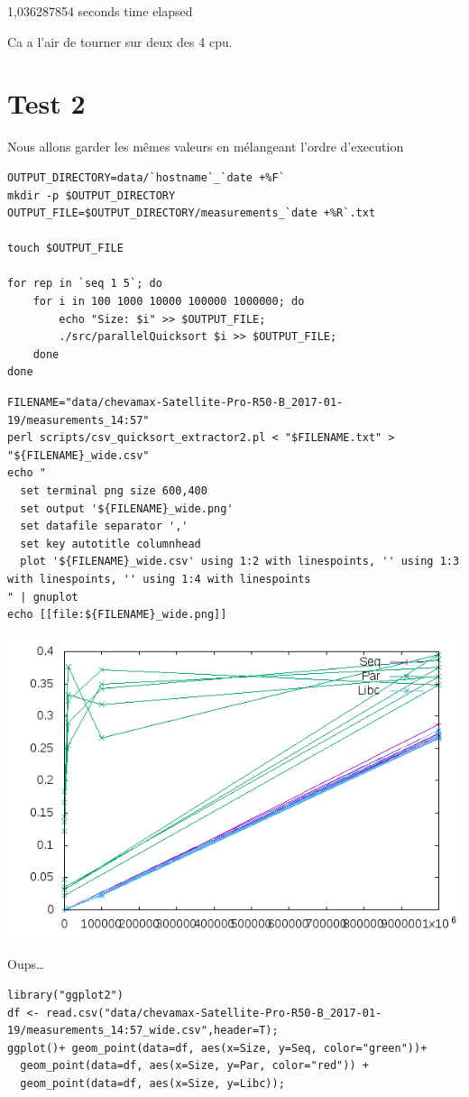 \documentclass[11pt]{article}
\begin{document}
1,036287854 seconds time elapsed

Ca a l'air de tourner sur deux des 4 cpu.

\section{Test 2}
\label{sec:orgheadline11}
Nous allons garder les mêmes valeurs en mélangeant l'ordre d'execution


\begin{verbatim}
OUTPUT_DIRECTORY=data/`hostname`_`date +%F`
mkdir -p $OUTPUT_DIRECTORY
OUTPUT_FILE=$OUTPUT_DIRECTORY/measurements_`date +%R`.txt

touch $OUTPUT_FILE

for rep in `seq 1 5`; do
	for i in 100 1000 10000 100000 1000000; do
		echo "Size: $i" >> $OUTPUT_FILE;
		./src/parallelQuicksort $i >> $OUTPUT_FILE;
	done
done
\end{verbatim}

\begin{verbatim}
FILENAME="data/chevamax-Satellite-Pro-R50-B_2017-01-19/measurements_14:57"
perl scripts/csv_quicksort_extractor2.pl < "$FILENAME.txt" > "${FILENAME}_wide.csv"
echo "
  set terminal png size 600,400 
  set output '${FILENAME}_wide.png'
  set datafile separator ','
  set key autotitle columnhead
  plot '${FILENAME}_wide.csv' using 1:2 with linespoints, '' using 1:3 with linespoints, '' using 1:4 with linespoints
" | gnuplot
echo [[file:${FILENAME}_wide.png]]
\end{verbatim}

\includegraphics[width=.9\linewidth]{data/chevamax-Satellite-Pro-R50-B_2017-01-19/measurements_14:57_wide.png}

Oups\ldots{}

\begin{verbatim}
library("ggplot2")
df <- read.csv("data/chevamax-Satellite-Pro-R50-B_2017-01-19/measurements_14:57_wide.csv",header=T);
ggplot()+ geom_point(data=df, aes(x=Size, y=Seq, color="green"))+
  geom_point(data=df, aes(x=Size, y=Par, color="red")) + 
  geom_point(data=df, aes(x=Size, y=Libc));
\end{verbatim}
\end{document}
